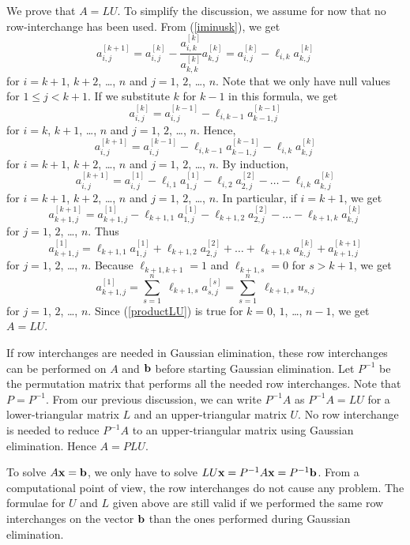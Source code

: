 We prove that $A=LU$.  To simplify the discussion, we assume for now
that no row-interchange has been used.  From (\ref{iminusk}), we get
\[
a^{[k+1]}_{i,j} = a^{[k]}_{i,j} - \frac{a^{[k]}_{i,k}}{a^{[k]}_{k,k}}
a^{[k]}_{k,j} =  a^{[k]}_{i,j} - \ell_{i,k} a^{[k]}_{k,j}
\]
for $i=k+1$, $k+2$, \ldots, $n$ and $j=1$, $2$, \ldots, $n$.
Note that we only have null values for $1 \leq j < k+1$.
If we substitute $k$ for $k-1$ in this formula, we get
\[
a^{[k]}_{i,j} = a^{[k-1]}_{i,j} - \ell_{i,k-1} a^{[k-1]}_{k-1,j} 
\]
for $i=k$, $k+1$, \ldots, $n$ and $j=1$, $2$, \ldots, $n$.
Hence,
\[
a^{[k+1]}_{i,j}=a^{[k-1]}_{i,j}-\ell_{i,k-1}a^{[k-1]}_{k-1,j}-\ell_{i,k}a^{[k]}_{k,j}
\]
for $i=k+1$, $k+2$, \ldots, $n$ and $j=1$, $2$, \ldots, $n$.
By induction,
\[
a^{[k+1]}_{i,j}=a^{[1]}_{i,j} -
\ell_{i,1}a^{[1]}_{1,j}-\ell_{i,2}a^{[2]}_{2,j} - \ldots
-\ell_{i,k}a^{[k]}_{k,j}
\]
for $i=k+1$, $k+2$, \ldots, $n$ and $j=1$, $2$, \ldots, $n$.
In particular, if $i=k+1$, we get
\[
a^{[k+1]}_{k+1,j}=a^{[1]}_{k+1,j} -
\ell_{k+1,1}a^{[1]}_{1,j}-\ell_{k+1,2}a^{[2]}_{2,j} - \ldots
-\ell_{k+1,k}a^{[k]}_{k,j}
\]
for $j=1$, $2$, \ldots, $n$.
Thus
\[
a^{[1]}_{k+1,j} = \ell_{k+1,1}a^{[1]}_{1,j} + \ell_{k+1,2}a^{[2]}_{2,j} + \ldots
+ \ell_{k+1,k}a^{[k]}_{k,j} + a^{[k+1]}_{k+1,j}
\]
for $j=1$, $2$, \ldots, $n$.
Because $\ell_{k+1,k+1} = 1$ and $\ell_{k+1,s}=0$ for $s>k+1$, we get
\begin{equation}\label{productLU}
a^{[1]}_{k+1,j} = \sum_{s=1}^n\; \ell_{k+1,s} a^{[s]}_{s,j}
= \sum_{s=1}^n\; \ell_{k+1,s} u_{s,j}
\end{equation}
for $j=1$, $2$, \ldots, $n$.  Since (\ref{productLU}) is true for
$k=0$, $1$, \ldots, $n-1$, we get $A=LU$.

If row interchanges are needed in Gaussian elimination, these row
interchanges can be performed on $A$ and $\mathbf{b}$ before starting
Gaussian elimination.  Let $P^{-1}$ be the permutation matrix that
performs all the needed row interchanges.  Note that $P=P^{-1}$.
From our previous discussion, we can write $P^{-1}A$ as $P^{-1}A=LU$
for a lower-triangular matrix $L$ and an upper-triangular matrix $U$.
No row interchange is needed to reduce $P^{-1}A$ to an
upper-triangular matrix using Gaussian elimination.  Hence $A=PLU$.

To solve $A\mathbf{x} = \mathbf{b}$, we only have to solve
$LU \mathbf{x} = P^{-1}A\mathbf{x}=P^{-1}\mathbf{b}$.
From a computational point of view, the row interchanges do not cause
any problem.  The formulae for $U$ and $L$ given above are still valid
if we performed the same row interchanges on the vector $\mathbf{b}$ than
the ones performed during Gaussian elimination.

